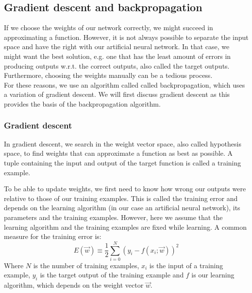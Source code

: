 
\subsection{Gradient descent and backpropagation} %
\label{sub:gradient_descent_and_backpropagation}
If we choose the weights of our network correctly, we might succeed in approximating a function.
However, it is not always possible to separate the input space and have the right with our artificial neural network.
In that case, we might want the best solution, e.g. one that has the least amount of errors in producing outputs w.r.t. the correct outputs, also called the target outputs. Furthermore, choosing the weights manually can be a tedious process.\\
For these reasons, we use an algorithm called called backpropagation, which uses a variation of gradient descent. We will first discuss gradient descent as this provides the basis of the backpropagation algorithm.

\subsubsection{Gradient descent} %
\label{ssub:gradient_descent}
In gradient descent, we search in the weight vector space, also called hypothesis space, to find weights that can approximate a function as best as possible. A tuple containing the input and output of the target function is called a training example.

To be able to update weights, we first need to know how wrong our outputs were relative to those of our training examples.
This is called the training error and depends on the learning algorithm (in our case an artificial neural network), its parameters and the training examples. However, here we assume that the learning algorithm and the training examples are fixed while learning.
A common measure for the training error is:
\begin{equation}
    E(\overrightarrow{w}) \equiv \frac{1}{2} \sum_{i=0}^N (y_i - f(x_i;\overrightarrow{w}))^2
\end{equation}
Where $N$ is the number of training examples, $x_i$ is the input of a training example, $y_i$ is the target output of the training example and $f$ is our learning algorithm, which depends on the weight vector $\overrightarrow{w}$.\\

